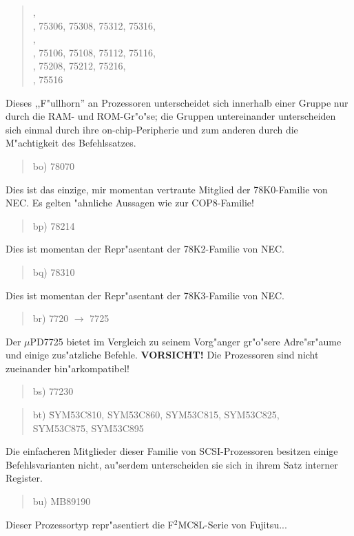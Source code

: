 \documentclass[12pt,a4paper,twoside]{report}
\begin{document}
{\begin{quote}
\begin{tabbing}
    , \\
    , 75306, 75308, 75312, 75316, \\
    , \\
    , 75106, 75108, 75112, 75116, \\
    , 75208, 75212, 75216, \\
    , 75516 \\
\end{tabbing}
\end{quote}
Dieses ,,F"ullhorn'' an Prozessoren unterscheidet sich innerhalb einer
Gruppe nur durch die RAM- und ROM-Gr"o"se; die Gruppen untereinander
unterscheiden sich einmal durch ihre on-chip-Peripherie und
zum anderen durch die M"achtigkeit des Befehlssatzes.
\begin{quote}
bo) 78070
\end{quote}
Dies ist das einzige, mir momentan vertraute Mitglied der
78K0-Familie von NEC.  Es gelten "ahnliche Aussagen wie zur
COP8-Familie!
\begin{quote}
bp) 78214
\end{quote}
Dies ist momentan der Repr"asentant der 78K2-Familie von NEC.
\begin{quote}
bq) 78310
\end{quote}
Dies ist momentan der Repr"asentant der 78K3-Familie von NEC.
\begin{quote}
br) 7720 $\rightarrow$ 7725
\end{quote}
Der $\mu$PD7725 bietet im Vergleich zu seinem Vorg"anger gr"o"sere
Adre"sr"aume und einige zus"atzliche Befehle. {\bf VORSICHT!}  Die
Prozessoren sind nicht zueinander bin"arkompatibel!
\begin{quote}
bs) 77230
\end{quote}
\begin{quote}
\begin{tabbing}
bt) \= SYM53C810, SYM53C860, SYM53C815, SYM53C825, \\
    \> SYM53C875, SYM53C895
\end{tabbing}
\end{quote}
Die einfacheren Mitglieder dieser Familie von SCSI-Prozessoren besitzen
einige Befehlsvarianten nicht, au"serdem unterscheiden sie sich in ihrem
Satz interner Register.
\begin{quote}
bu) MB89190
\end{quote}
Dieser Prozessortyp repr"asentiert die F$^{2}$MC8L-Serie von Fujitsu...
}
\end{document}
